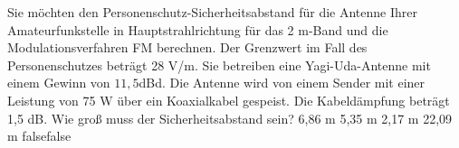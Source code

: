     {Sie möchten den Personenschutz-Sicherheitsabstand für die Antenne Ihrer Amateurfunkstelle in Hauptstrahlrichtung für das 2 m-Band und die Modulationsverfahren FM berechnen. Der Grenzwert im Fall des Personenschutzes beträgt 28 V/m. Sie betreiben eine Yagi-Uda-Antenne mit einem Gewinn von $11,5 $dBd. Die Antenne wird von einem Sender mit einer Leistung von 75 W über ein Koaxialkabel gespeist. Die Kabeldämpfung beträgt 1,5 dB. Wie groß muss der Sicherheitsabstand sein?}
    {6,86 m}
    {5,35 m}
    {2,17 m}
    {22,09 m}
    {false}{false}